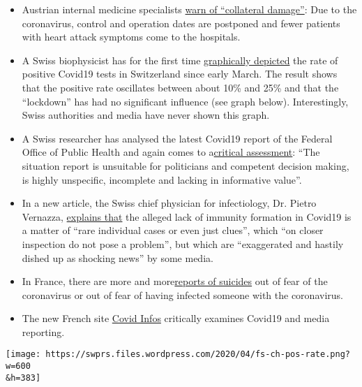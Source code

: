 \begin{itemize}
{  defended himself} against criticism of his pilot study. Streeck found
  a lethality (based on cases) of 0.37\% and a mortality (based on
  population) of 0.06\%, which corresponds to a strong seasonal flu.
\item
  Austrian internal medicine specialists
  \href{https://wien.orf.at/stories/3044064}{warn of ``collateral
  damage''}: Due to the coronavirus, control and operation dates are
  postponed and fewer patients with heart attack symptoms come to the
  hospitals.
\item
  A Swiss biophysicist has for the first time
  \href{https://swprs.org/rate-of-positive-covid19-tests/}{graphically
  depicted} the rate of positive Covid19 tests in Switzerland since
  early March. The result shows that the positive rate oscillates
  between about 10\% and 25\% and that the ``lockdown'' has had no
  significant influence (see graph below). Interestingly, Swiss
  authorities and media have never shown this graph.
\item
  A Swiss researcher has analysed the latest Covid19 report of the
  Federal Office of Public Health and again comes to
  a\href{https://covid-19-fakten.blogspot.com/2020/04/der-bag-situationsbericht-vom-1442020.html}{critical
  assessment}: ``The situation report is unsuitable for politicians and
  competent decision making, is highly unspecific, incomplete and
  lacking in informative value''.
\item
  In a new article, the Swiss chief physician for infectiology, Dr.
  Pietro Vernazza,
  \href{https://infekt.ch/2020/04/hinterlaesst-coronavirus-eine-immunitaet/}{explains
  that} the alleged lack of immunity formation in Covid19 is a matter of
  ``rare individual cases or even just clues'', which ``on closer
  inspection do not pose a problem'', but which are ``exaggerated and
  hastily dished up as shocking news'' by some media.
\item
  In France, there are more and
  more\href{https://www.midilibre.fr/2020/04/09/coronavirus-ces-suicides-de-malades-ou-de-personnes-tenaillees-par-langoisse,8839373.php}{reports
  of suicides} out of fear of the coronavirus or out of fear of having
  infected someone with the coronavirus.
\item
  The new French site \href{https://covidinfos.net/}{Covid Infos}
  critically examines Covid19 and media reporting.
\end{itemize}

\texttt{[image: https://swprs.files.wordpress.com/2020/04/fs-ch-pos-rate.png?w=600\\\&h=383]}

